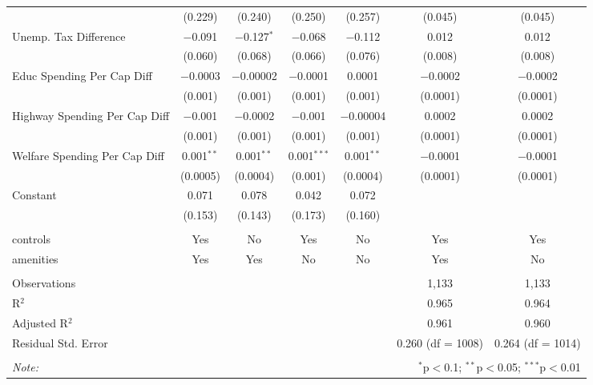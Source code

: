\begin{table}[!htbp]
\begin{tabular}{@{\extracolsep{5pt}}lcccccc}
  & (0.229) & (0.240) & (0.250) & (0.257) & (0.045) & (0.045) \\ 
  Unemp. Tax Difference & $-$0.091 & $-$0.127$^{*}$ & $-$0.068 & $-$0.112 & 0.012 & 0.012 \\ 
  & (0.060) & (0.068) & (0.066) & (0.076) & (0.008) & (0.008) \\ 
  Educ Spending Per Cap Diff & $-$0.0003 & $-$0.00002 & $-$0.0001 & 0.0001 & $-$0.0002 & $-$0.0002 \\ 
  & (0.001) & (0.001) & (0.001) & (0.001) & (0.0001) & (0.0001) \\ 
  Highway Spending Per Cap Diff & $-$0.001 & $-$0.0002 & $-$0.001 & $-$0.00004 & 0.0002 & 0.0002 \\ 
  & (0.001) & (0.001) & (0.001) & (0.001) & (0.0001) & (0.0001) \\ 
  Welfare Spending Per Cap Diff & 0.001$^{**}$ & 0.001$^{**}$ & 0.001$^{***}$ & 0.001$^{**}$ & $-$0.0001 & $-$0.0001 \\ 
  & (0.0005) & (0.0004) & (0.001) & (0.0004) & (0.0001) & (0.0001) \\ 
  Constant & 0.071 & 0.078 & 0.042 & 0.072 &  &  \\ 
  & (0.153) & (0.143) & (0.173) & (0.160) &  &  \\ 
 \hline \\[-1.8ex] 
controls & Yes & No & Yes & No & Yes & Yes \\ 
amenities & Yes & Yes & No & No & Yes & No \\ 
\hline \\[-1.8ex] 
Observations &  &  &  &  & 1,133 & 1,133 \\ 
R$^{2}$ &  &  &  &  & 0.965 & 0.964 \\ 
Adjusted R$^{2}$ &  &  &  &  & 0.961 & 0.960 \\ 
Residual Std. Error &  &  &  &  & 0.260 (df = 1008) & 0.264 (df = 1014) \\ 
\hline 
\hline \\[-1.8ex] 
\textit{Note:}  & \multicolumn{6}{r}{$^{*}$p$<$0.1; $^{**}$p$<$0.05; $^{***}$p$<$0.01} \\ 
\end{tabular} 
\end{table} 
